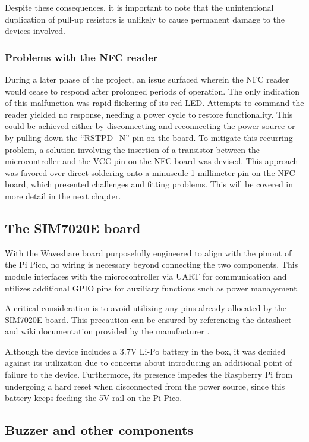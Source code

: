 Despite these consequences, it is important to note that the unintentional duplication of pull-up resistors is unlikely to 
cause permanent damage to the devices involved.

\subsubsection*{Problems with the NFC reader}

During a later phase of the project, an issue surfaced wherein the NFC reader would cease to respond after prolonged periods 
of operation. The only indication of this malfunction was rapid flickering of its red LED. Attempts to command the reader 
yielded no response, needing a power cycle to restore functionality. This could be achieved either by disconnecting and 
reconnecting the power source or by pulling down the ``RSTPD\_N'' pin on the board. To mitigate this recurring problem, a 
solution involving the insertion of a transistor between the microcontroller and the VCC pin on the NFC board was devised. 
This approach was favored over direct soldering onto a minuscule 1-millimeter pin on the NFC board, which presented 
challenges and fitting problems. This will be covered in more detail in the next chapter.


\subsection{The SIM7020E board}

With the Waveshare board purposefully engineered to align with the pinout of the Pi Pico, no wiring is necessary beyond 
connecting the two components. This module interfaces with the microcontroller via UART for communication and utilizes 
additional GPIO pins for auxiliary functions such as power management.

A critical consideration is to avoid utilizing any pins already allocated by the SIM7020E board. This precaution can be 
ensured by referencing the datasheet and wiki documentation provided by the manufacturer \cite{sim7020e_wiki}.

Although the device includes a 3.7V Li-Po battery in the box, it was decided against its utilization due to concerns about 
introducing an additional point of failure to the device. Furthermore, its presence impedes the Raspberry Pi from undergoing 
a hard reset when disconnected from the power source, since this battery keeps feeding the 5V rail on the Pi Pico.


\subsection{Buzzer and other components}

